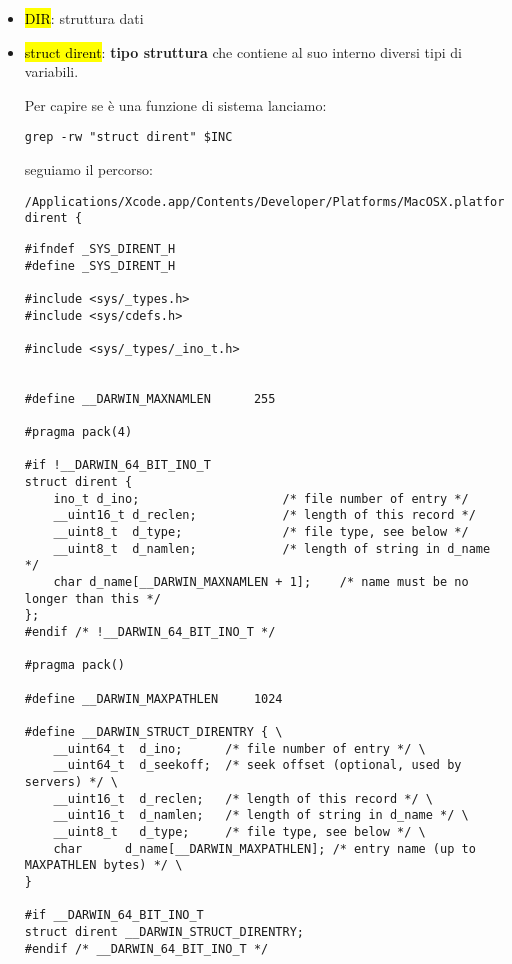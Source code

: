 \begin{itemize}
	\item \hl{DIR}: struttura dati
	\item \hl{struct dirent}: \textbf{tipo struttura} che contiene al suo interno diversi tipi di variabili. 
	
		Per capire se è una funzione di sistema lanciamo:
		
\begin{lstlisting}
grep -rw "struct dirent" $INC
\end{lstlisting}
		
		seguiamo il percorso:
		
\begin{lstlisting}
/Applications/Xcode.app/Contents/Developer/Platforms/MacOSX.platform/Developer/SDKs/MacOSX.sdk/usr/include//sys/dirent.h:struct dirent {
\end{lstlisting}
		
\begin{lstlisting}
#ifndef _SYS_DIRENT_H
#define _SYS_DIRENT_H

#include <sys/_types.h>
#include <sys/cdefs.h>

#include <sys/_types/_ino_t.h>


#define __DARWIN_MAXNAMLEN      255

#pragma pack(4)

#if !__DARWIN_64_BIT_INO_T
struct dirent {
	ino_t d_ino;                    /* file number of entry */
	__uint16_t d_reclen;            /* length of this record */
	__uint8_t  d_type;              /* file type, see below */
	__uint8_t  d_namlen;            /* length of string in d_name */
	char d_name[__DARWIN_MAXNAMLEN + 1];    /* name must be no longer than this */
};
#endif /* !__DARWIN_64_BIT_INO_T */

#pragma pack()

#define __DARWIN_MAXPATHLEN     1024

#define __DARWIN_STRUCT_DIRENTRY { \
	__uint64_t  d_ino;      /* file number of entry */ \
	__uint64_t  d_seekoff;  /* seek offset (optional, used by servers) */ \
	__uint16_t  d_reclen;   /* length of this record */ \
	__uint16_t  d_namlen;   /* length of string in d_name */ \
	__uint8_t   d_type;     /* file type, see below */ \
	char      d_name[__DARWIN_MAXPATHLEN]; /* entry name (up to MAXPATHLEN bytes) */ \
}

#if __DARWIN_64_BIT_INO_T
struct dirent __DARWIN_STRUCT_DIRENTRY;
#endif /* __DARWIN_64_BIT_INO_T */




\end{lstlisting}
\end{itemize}
